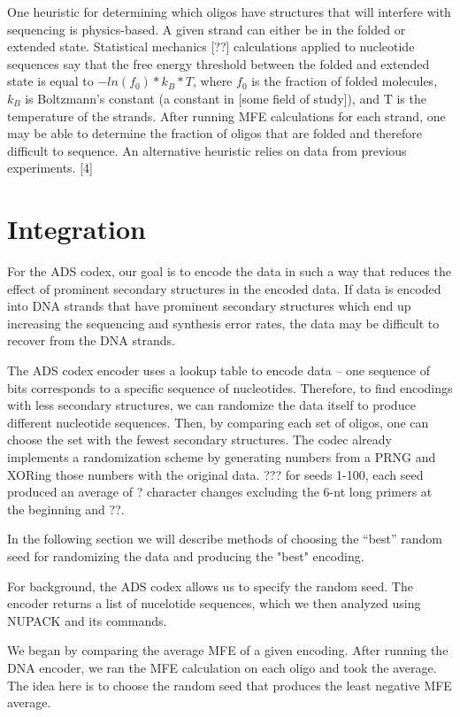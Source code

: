 \documentclass{article}
\begin{document}
One heuristic for determining which oligos have structures that will interfere with sequencing is physics-based. A given strand can either be in the folded or extended state. Statistical mechanics [??] calculations applied to nucleotide sequences say that the free energy threshold between the folded and extended state is equal to $-ln(f_0) * k_B * T$, where $f_0$ is the fraction of folded molecules, $k_B$ is Boltzmann’s constant (a constant in [some field of study]), and T is the temperature of the strands. After running MFE calculations for each strand, one may be able to determine the fraction of oligos that are folded and therefore difficult to sequence. An alternative heuristic relies on data from previous experiments. [4]

\section{Integration}

For the ADS codex, our goal is to encode the data in such a way that reduces the effect of prominent secondary structures in the encoded data. If data is encoded into DNA strands that have prominent secondary structures which end up increasing the sequencing and synthesis error rates, the data may be difficult to recover from the DNA strands. 

The ADS codex encoder uses a lookup table to encode data -- one sequence of bits corresponds to a specific sequence of nucleotides. Therefore, to find encodings with less secondary structures, we can randomize the data itself to produce different nucleotide sequences. Then, by comparing each set of oligos, one can choose the set with the fewest secondary structures. The codec already implements a randomization scheme by generating numbers from a PRNG and XORing those numbers with the original data. ??? for seeds 1-100, each seed produced an average of ? character changes excluding the 6-nt long primers at the beginning and ??. 

In the following section we will describe methods of choosing the “best” random seed for randomizing the data and producing the "best" encoding. 

For background, the ADS codex allows us to specify the random seed. The encoder returns a list of nucelotide sequences, which we then analyzed using NUPACK and its commands.

We began by comparing the average MFE of a given encoding. After running the DNA encoder, we ran the MFE calculation on each oligo and took the average. The idea here is to choose the random seed that produces the least negative MFE average.
\end{document}
